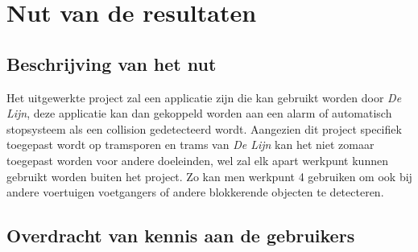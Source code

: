 \documentclass[a4paper,oneside,11pt,final]{memoir}
\begin{document}
\section*{Nut van de resultaten}\label{sec:Nut}

\subsection{Beschrijving van het nut}\label{sec:BeschrijvingNut}



Het uitgewerkte project zal een applicatie zijn die kan gebruikt worden door \emph{De Lijn}, deze applicatie kan dan gekoppeld worden aan een alarm of automatisch stopsysteem als een collision gedetecteerd wordt. Aangezien dit project specifiek toegepast wordt op tramsporen en trams van \emph{De Lijn} kan het niet zomaar toegepast worden voor andere doeleinden, wel zal elk apart werkpunt kunnen gebruikt worden buiten het project.
Zo kan men werkpunt 4 gebruiken om ook bij andere voertuigen voetgangers of andere blokkerende objecten te detecteren.

\subsection{Overdracht van kennis aan de gebruikers}\label{sec:Overdracht}

\end{document}
